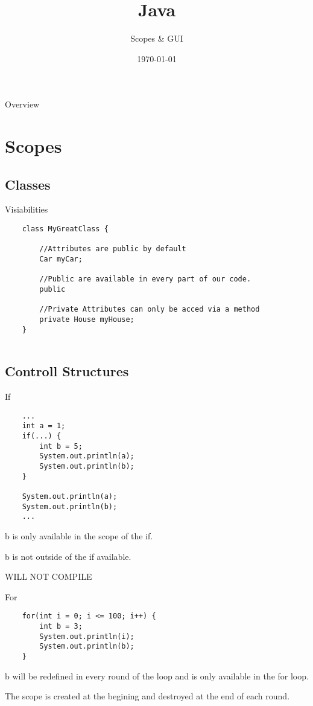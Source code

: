 


\title{Java}
\subtitle{Scopes \& GUI}
\date{\today}



\begin{frame}
\titlepage
\end{frame}

\begin{frame}{Overview}
\tableofcontents
\end{frame}

\section{Scopes}
\subsection{Classes}

\begin{frame}[fragile]{Visiabilities}
	\begin{lstlisting}
	class MyGreatClass {
	
		//Attributes are public by default
		Car myCar; 
	
		//Public are available in every part of our code.
		public 
		
		//Private Attributes can only be acced via a method
		private House myHouse;
	}
		
	\end{lstlisting}
\end{frame}

\subsection{Controll Structures}
\begin{frame}[fragile]{If}
	\begin{lstlisting}
	...
	int a = 1;
	if(...) {
		int b = 5;
		System.out.println(a);
		System.out.println(b);
	}
	
	System.out.println(a);
	System.out.println(b);
	...
	\end{lstlisting}
	
	b is only available in the scope of the if.
	
	b is not outside of the if available.
	
	\color{red} WILL NOT COMPILE
\end{frame}

\begin{frame}[fragile]{For}
	\begin{lstlisting}
	for(int i = 0; i <= 100; i++) {
		int b = 3;
		System.out.println(i);
		System.out.println(b);
	}
	\end{lstlisting}
	
	b will be redefined in every round of the loop and is only available in the for loop.
	
	The scope is created at the begining and destroyed at the end of each round.
\end{frame}

